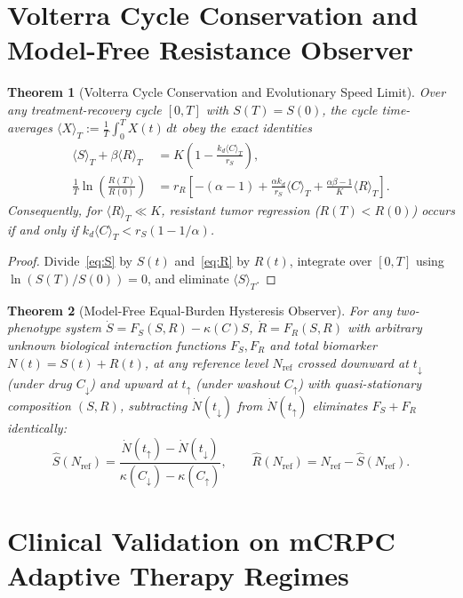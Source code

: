 \documentclass[11pt,reqno]{article}
\newtheorem{theorem}{Theorem}[section]
\begin{document}
\section{Volterra Cycle Conservation and Model-Free Resistance Observer}

\begin{theorem}[Volterra Cycle Conservation and Evolutionary Speed Limit]\label{thm:volterra}
Over any treatment-recovery cycle $[0,T]$ with $S(T)=S(0)$, the cycle time-averages $\langle X\rangle_T := \frac{1}{T}\int_0^T X(t)\,dt$ obey the exact identities
\begin{align}
\langle S\rangle_T + \beta\langle R\rangle_T &= K\left(1 - \frac{k_d\langle C\rangle_T}{r_S}\right), \\
\frac{1}{T}\ln\!\left(\frac{R(T)}{R(0)}\right) &= r_R\left[-(\alpha - 1) + \frac{\alpha k_d}{r_S}\langle C\rangle_T + \frac{\alpha\beta - 1}{K}\langle R\rangle_T\right].
\end{align}
Consequently, for $\langle R\rangle_T \ll K$, resistant tumor regression ($R(T) < R(0)$) occurs if and only if $k_d\langle C\rangle_T < r_S(1 - 1/\alpha)$.
\end{theorem}
\begin{proof}
Divide~\eqref{eq:S} by $S(t)$ and~\eqref{eq:R} by $R(t)$, integrate over $[0,T]$ using $\ln(S(T)/S(0))=0$, and eliminate $\langle S\rangle_T$.
\end{proof}

\begin{theorem}[Model-Free Equal-Burden Hysteresis Observer]\label{thm:observer}
For any two-phenotype system $\dot{S} = F_S(S,R) - \kappa(C)S$, $\dot{R} = F_R(S,R)$ with arbitrary unknown biological interaction functions $F_S, F_R$ and total biomarker $N(t) = S(t)+R(t)$, at any reference level $N_{\mathrm{ref}}$ crossed downward at $t_{\downarrow}$ (under drug $C_{\downarrow}$) and upward at $t_{\uparrow}$ (under washout $C_{\uparrow}$) with quasi-stationary composition $(S,R)$, subtracting $\dot{N}(t_{\downarrow})$ from $\dot{N}(t_{\uparrow})$ eliminates $F_S+F_R$ identically:
\begin{equation}
\widehat{S}(N_{\mathrm{ref}}) = \frac{\dot{N}(t_{\uparrow}) - \dot{N}(t_{\downarrow})}{\kappa(C_{\downarrow}) - \kappa(C_{\uparrow})}, \qquad \widehat{R}(N_{\mathrm{ref}}) = N_{\mathrm{ref}} - \widehat{S}(N_{\mathrm{ref}}).
\end{equation}
\end{theorem}

\section{Clinical Validation on mCRPC Adaptive Therapy Regimes}
\end{document}
